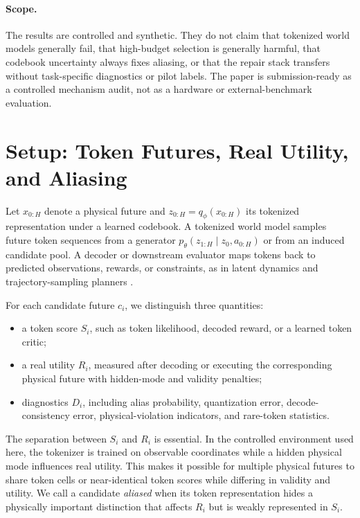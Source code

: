 \documentclass{article}
\begin{document}
\paragraph{Scope.}
The results are controlled and synthetic. They do not claim that tokenized world models generally fail, that high-budget selection is generally harmful, that codebook uncertainty always fixes aliasing, or that the repair stack transfers without task-specific diagnostics or pilot labels. The paper is submission-ready as a controlled mechanism audit, not as a hardware or external-benchmark evaluation.

\section{Setup: Token Futures, Real Utility, and Aliasing}
\label{sec:setup}

Let $x_{0:H}$ denote a physical future and $z_{0:H}=q_\phi(x_{0:H})$ its tokenized representation under a learned codebook. A tokenized world model samples future token sequences from a generator $p_\theta(z_{1:H}\mid z_0,a_{0:H})$ or from an induced candidate pool. A decoder or downstream evaluator maps tokens back to predicted observations, rewards, or constraints, as in latent dynamics and trajectory-sampling planners \citep{hafner2020dream,chua2018deep,williams2017information}.

For each candidate future $c_i$, we distinguish three quantities:
\begin{itemize}
\item a token score $S_i$, such as token likelihood, decoded reward, or a learned token critic;
\item a real utility $R_i$, measured after decoding or executing the corresponding physical future with hidden-mode and validity penalties;
\item diagnostics $D_i$, including alias probability, quantization error, decode-consistency error, physical-violation indicators, and rare-token statistics.
\end{itemize}

The separation between $S_i$ and $R_i$ is essential. In the controlled environment used here, the tokenizer is trained on observable coordinates while a hidden physical mode influences real utility. This makes it possible for multiple physical futures to share token cells or near-identical token scores while differing in validity and utility. We call a candidate \emph{aliased} when its token representation hides a physically important distinction that affects $R_i$ but is weakly represented in $S_i$.
\end{document}

